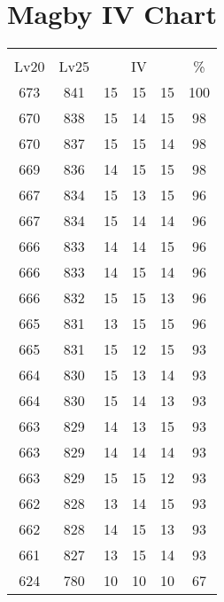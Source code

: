 \documentclass{article}%
\begin{document}
%
\normalsize%
\section{Magby IV Chart}%
\label{sec:Magby IV Chart}%
\renewcommand{\arraystretch}{1.5}%
\begin{tabular}{|c|c|c|c|c|c|}%
\hline%
\multicolumn{6}{|c|}{\textcolor{white}{ 
\linebreak{Magby}
}%
\cellcolor{black}}\\%
\multicolumn{1}{|c}{Lv20}&\multicolumn{1}{c|}{Lv25}&\multicolumn{3}{c|}{IV}&\multicolumn{1}{|c|}{\%}\\%
\hline%
\rowcolor{color100}%
673&841&15&15&15&100\\%
\hline%
\rowcolor{color98}%
670&838&15&14&15&98\\%
\hline%
\rowcolor{color98}%
670&837&15&15&14&98\\%
\hline%
\rowcolor{color98}%
669&836&14&15&15&98\\%
\hline%
\rowcolor{color96}%
667&834&15&13&15&96\\%
\hline%
\rowcolor{color96}%
667&834&15&14&14&96\\%
\hline%
\rowcolor{color96}%
666&833&14&14&15&96\\%
\hline%
\rowcolor{color96}%
666&833&14&15&14&96\\%
\hline%
\rowcolor{color96}%
666&832&15&15&13&96\\%
\hline%
\rowcolor{color96}%
665&831&13&15&15&96\\%
\hline%
\rowcolor{color93}%
665&831&15&12&15&93\\%
\hline%
\rowcolor{color93}%
664&830&15&13&14&93\\%
\hline%
\rowcolor{color93}%
664&830&15&14&13&93\\%
\hline%
\rowcolor{color93}%
663&829&14&13&15&93\\%
\hline%
\rowcolor{color93}%
663&829&14&14&14&93\\%
\hline%
\rowcolor{color93}%
663&829&15&15&12&93\\%
\hline%
\rowcolor{color93}%
662&828&13&14&15&93\\%
\hline%
\rowcolor{color93}%
662&828&14&15&13&93\\%
\hline%
\rowcolor{color93}%
661&827&13&15&14&93\\%
\hline%
\rowcolor{color91}%
624&780&10&10&10&67\\%
\end{tabular}

%
\end{document}
